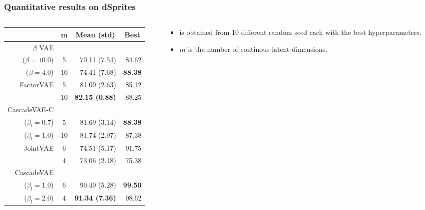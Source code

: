 \documentclass[10pt,mathserif]{beamer}
\begin{document}
\begin{frame}
\frametitle{Quantitative results on dSprites}
\begin{columns}
\begin{column}{0.5\textwidth}
\begin{table}[htbp]
\centering
\fontsize{9pt}{9.5pt}\selectfont
\begin{tabular}{rc rr}
\addlinespace[-\aboverulesep]
\toprule
\multicolumn{1}{c}{Method}&m&\multicolumn{1}{c}{Mean (std)}&\multicolumn{1}{c}{Best}\\
\toprule
$\beta$ VAE\\($\beta=10.0$)& 5 & 70.11 (7.54)&84.62\\
($\beta=4.0$)& 10 &74.41 (7.68)&\textbf{88.38}\\
\midrule
FactorVAE& 5  &81.09 (2.63)&85.12\\
        & 10 &\textbf{82.15 (0.88)}&88.25\\
\midrule
CascadeVAE-C\\($\beta_l=0.7$)& 5  &81.69 (3.14)&\textbf{88.38}\\
    ($\beta_l=1.0$)& 10 &81.74 (2.97)&87.38\\
\midrule
\midrule
JointVAE & 6 &  74.51 (5.17)&91.75\\
        & 4 &  73.06 (2.18)&75.38\\
\midrule
CascadeVAE\\($\beta_l=1.0$)& 6 &90.49 (5.28)&\textbf{99.50}\\
($\beta_l=2.0$)& 4 &\textbf{91.34 (7.36)}&98.62\\
\bottomrule
\end{tabular}
\end{table}
\end{column}
\begin{column}{0.4\textwidth}
\begin{itemize}\itemsep=12pt
\item {\color{blue}{Disentanglement score}} is obtained from 10 different random seed each with the best hyperparameters. 
\item $m$ is the number of continous latent dimensions.
\end{itemize}
\end{column}
\end{columns}
\end{frame}
\end{document}
